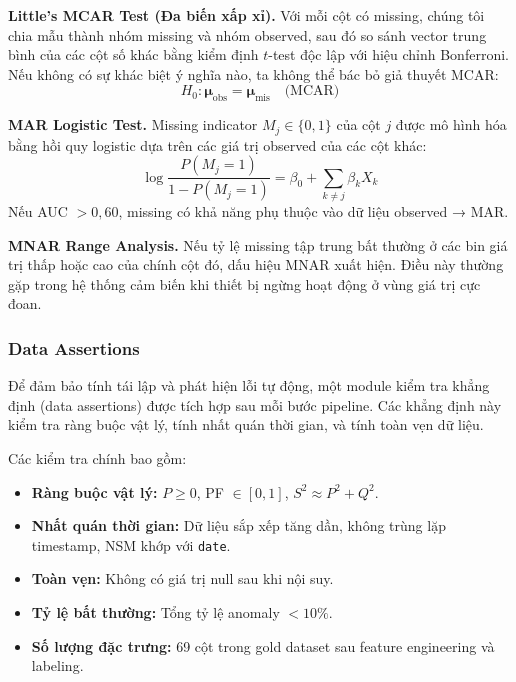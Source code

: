 \textbf{Little's MCAR Test (Đa biến xấp xỉ).}
Với mỗi cột có missing, chúng tôi chia mẫu thành nhóm missing và nhóm observed, sau đó so sánh vector trung bình của các cột số khác bằng kiểm định $t$-test độc lập với hiệu chỉnh Bonferroni.
Nếu không có sự khác biệt ý nghĩa nào, ta không thể bác bỏ giả thuyết MCAR:
\begin{equation}
H_0: \boldsymbol{\mu}_{\text{obs}} = \boldsymbol{\mu}_{\text{mis}} \quad \text{(MCAR)}
\label{eq:mcar}
\end{equation}

\textbf{MAR Logistic Test.}
Missing indicator $M_j \in \{0,1\}$ của cột $j$ được mô hình hóa bằng hồi quy logistic dựa trên các giá trị observed của các cột khác:
\begin{equation}
\log\frac{P(M_j=1)}{1-P(M_j=1)} = \beta_0 + \sum_{k \neq j} \beta_k X_k
\label{eq:mar}
\end{equation}
Nếu AUC $> 0{,}60$, missing có khả năng phụ thuộc vào dữ liệu observed → MAR.

\textbf{MNAR Range Analysis.}
Nếu tỷ lệ missing tập trung bất thường ở các bin giá trị thấp hoặc cao của chính cột đó, dấu hiệu MNAR xuất hiện.
Điều này thường gặp trong hệ thống cảm biến khi thiết bị ngừng hoạt động ở vùng giá trị cực đoan.

\subsubsection{Data Assertions}

Để đảm bảo tính tái lập và phát hiện lỗi tự động, một module kiểm tra khẳng định (data assertions) được tích hợp sau mỗi bước pipeline.
Các khẳng định này kiểm tra ràng buộc vật lý, tính nhất quán thời gian, và tính toàn vẹn dữ liệu.

Các kiểm tra chính bao gồm:
\begin{itemize}
    \item \textbf{Ràng buộc vật lý:} $P \ge 0$, PF $\in [0,1]$, $S^2 \approx P^2 + Q^2$.
    \item \textbf{Nhất quán thời gian:} Dữ liệu sắp xếp tăng dần, không trùng lặp timestamp, NSM khớp với \texttt{date}.
    \item \textbf{Toàn vẹn:} Không có giá trị null sau khi nội suy.
    \item \textbf{Tỷ lệ bất thường:} Tổng tỷ lệ anomaly $< 10\%$.
    \item \textbf{Số lượng đặc trưng:} 69 cột trong gold dataset sau feature engineering và labeling.
\end{itemize}

